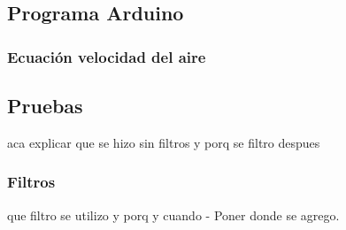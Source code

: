 	

    \subsection{Programa Arduino}
        \subsubsection{Ecuación velocidad del aire}
    \subsection{Pruebas}
    aca explicar que se hizo sin filtros y porq se filtro despues
        \subsubsection{Filtros}
        que filtro se utilizo y porq y cuando
    - Poner donde se agrego.

\newpage